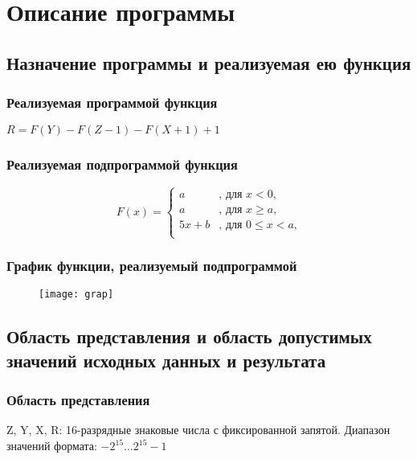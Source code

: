 \section{Описание программы}
\subsection{Назначение программы и реализуемая ею функция}
\subsubsection{Реализуемая программой функция}
	\begin{center}
		$ R = F(Y) - F(Z-1) - F(X+1) + 1 $
	\end{center}
\subsubsection{Реализуемая подпрограммой функция}
	\begin{center}
		\[
			F(x) =  \begin{cases}
			a & \textrm{, для } x<0\textrm{,}\\
			a & \textrm{, для } x \geq a\textrm{,}\\
			5x + b & \textrm{, для } 0 \leq x < a\textrm{,}\\
			\end{cases}
		\]
	\end{center}

\subsubsection{График функции, реализуемый подпрограммой}
\begin{figure}[H]
	\centering
	\texttt{[image: grap]}
	\label{pic:grap}
\end{figure}

\subsection{Область представления и область допустимых значений исходных данных и результата}
\subsubsection{Область представления}
\noindent Z, Y, X, R: 16-разрядные знаковые числа с фиксированной запятой. Диапазон значений формата: $-2^{15}\ldots2^{15}-1$\\


